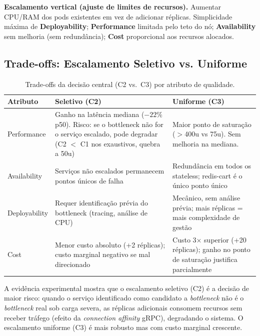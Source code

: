 \documentclass[manuscript,oneside]{acmart}
\begin{document}
\textbf{Escalamento vertical (ajuste de limites de recursos).} Aumentar CPU/RAM dos pods existentes em vez de adicionar réplicas. Simplicidade máxima de \textbf{Deployability}; \textbf{Performance} limitada pelo teto do nó; \textbf{Availability} sem melhoria (sem redundância); \textbf{Cost} proporcional aos recursos alocados.

\subsection{Trade-offs: Escalamento Seletivo vs. Uniforme}

\begin{table}[H]
\caption{Trade-offs da decisão central (C2 vs.\ C3) por atributo de qualidade.}
\label{tab:tradeoffs}
\begin{tabular}{p{1.8cm}p{2.8cm}p{2.8cm}}
\toprule
\textbf{Atributo} & \textbf{Seletivo (C2)} & \textbf{Uniforme (C3)} \\
\midrule
Performance & Ganho na latência mediana ($-22\%$ p50). Risco: se o bottleneck não for o serviço escalado, pode degradar (C2 $<$ C1 nos exaustivos, quebra a 50u) & Maior ponto de saturação ($>$400u vs 75u). Sem melhoria na mediana. \\
\addlinespace
Availability & Serviços não escalados permanecem pontos únicos de falha & Redundância em todos os stateless; redis-cart é o único ponto único \\
\addlinespace
Deployability & Requer identificação prévia do bottleneck (tracing, análise de CPU) & Mecânico, sem análise prévia; mais réplicas = mais complexidade de gestão \\
\addlinespace
Cost & Menor custo absoluto (+2 réplicas); custo marginal negativo se mal direcionado & Custo 3× superior (+20 réplicas); ganho no ponto de saturação justifica parcialmente \\
\bottomrule
\end{tabular}
\end{table}

A evidência experimental mostra que o escalamento seletivo (C2) é a decisão de maior risco: quando o serviço identificado como candidato a \textit{bottleneck} não é o \textit{bottleneck} real sob carga severa, as réplicas adicionais consomem recursos sem receber tráfego (efeito da \textit{connection affinity} gRPC), degradando o sistema. O escalamento uniforme (C3) é mais robusto mas com custo marginal crescente.

\end{document}
